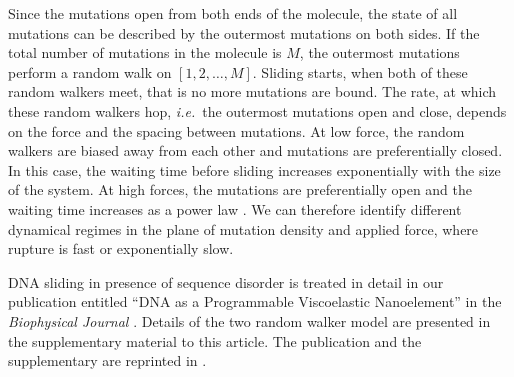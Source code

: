 Since the mutations open from both ends of the molecule, the state of all mutations
can be described by the outermost mutations on both sides. If the total number of mutations
in the molecule is $M$, the outermost mutations perform a random walk on $[1,2,\ldots,M]$.
Sliding starts, when both of these random walkers meet, that is no more mutations are bound.
The rate, at which these random walkers hop, \emph{i.e.}~the outermost mutations open and close,
depends on the force and the spacing between mutations. At low force, the random walkers
are biased away from each other and mutations are preferentially closed. In this case, the 
waiting time before sliding increases exponentially with the size of the system. At high forces,
the mutations are preferentially open and the waiting time increases as a power law \cite{Schwarz_75}. 
We can therefore identify different dynamical regimes in the plane of 
mutation density and applied force, where rupture is fast or exponentially slow. 

DNA sliding in presence of sequence disorder is treated in detail in our publication entitled ``DNA as a 
Programmable Viscoelastic Nanoelement'' in the \emph{Biophysical Journal} \cite{Neher_BioPhysJ_05}. 
Details of the two random walker model are presented in the supplementary material to this article. 
The publication and the supplementary are reprinted in .

